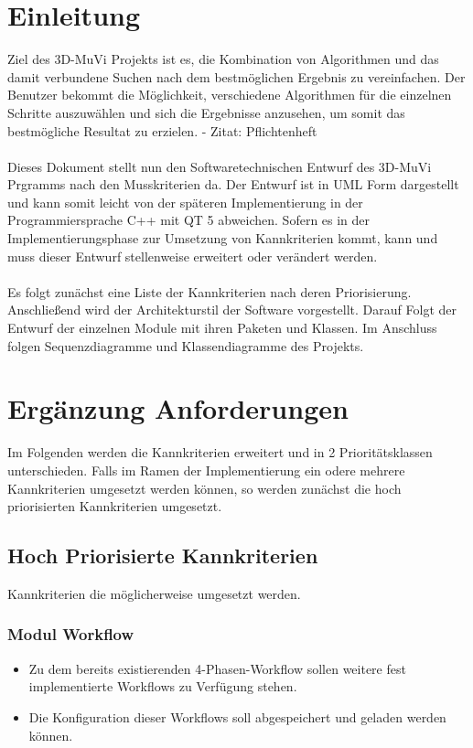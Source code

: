 \section{Einleitung}

Ziel des 3D-MuVi Projekts ist es, die Kombination von Algorithmen und das damit
verbundene Suchen nach dem bestmöglichen Ergebnis zu vereinfachen. 
Der Benutzer bekommt die Möglichkeit, verschiedene Algorithmen für die einzelnen Schritte auszuwählen
und sich die Ergebnisse anzusehen, um somit das bestmögliche Resultat zu erzielen.  \linebreak 
 - Zitat: Pflichtenheft
\\\\
Dieses Dokument stellt nun den Softwaretechnischen Entwurf des 3D-MuVi Prgramms nach den Musskriterien da.
Der Entwurf ist in UML Form dargestellt und kann somit leicht von der späteren Implementierung in der Programmiersprache C++ mit QT 5 abweichen. 
Sofern es in der Implementierungsphase zur Umsetzung von Kannkriterien kommt, kann und muss dieser Entwurf stellenweise erweitert oder verändert werden.
\\\\
Es folgt zunächst eine Liste der Kannkriterien nach deren Priorisierung. 
Anschließend wird der Architekturstil der Software vorgestellt.
Darauf Folgt der Entwurf der einzelnen Module mit ihren Paketen und Klassen.
Im Anschluss folgen Sequenzdiagramme und Klassendiagramme des Projekts.


\section{Ergänzung Anforderungen}
Im Folgenden werden die Kannkriterien erweitert und in 2 Prioritätsklassen unterschieden.
Falls im Ramen der Implementierung ein odere mehrere Kannkriterien umgesetzt werden können, so werden zunächst die hoch priorisierten Kannkriterien umgesetzt.

\subsection{Hoch Priorisierte Kannkriterien}
Kannkriterien die möglicherweise umgesetzt werden.

\subsubsection{Modul Workflow}
\begin{itemize}
\item Zu dem bereits existierenden 4-Phasen-Workflow sollen weitere fest implementierte Workflows zu Verfügung stehen.
\item Die Konfiguration dieser Workflows soll abgespeichert und geladen werden können.
\end{itemize}
